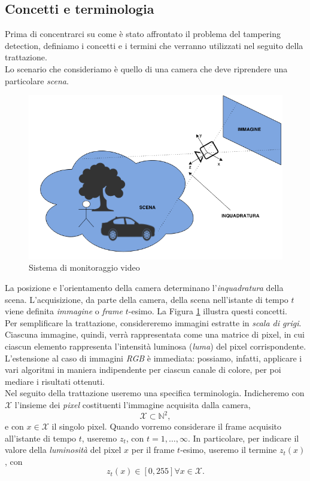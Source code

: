 \subsection{Concetti e terminologia}
\label{concetti}
Prima di concentrarci su come \`e stato affrontato il problema del tampering detection, definiamo i concetti e i termini che verranno utilizzati nel seguito della trattazione.\\
Lo scenario che consideriamo \`e quello di una camera che deve riprendere una particolare \textit{\gls{scena}}.
\begin{figure}[tb]
	\centering
	\includegraphics[width=12cm]{./pictures/videoMonitoring}
	\caption{Sistema di monitoraggio video}
	\label{fig:videoMonitoring}
\end{figure}
\noindent 
La posizione e l'orientamento della camera determinano l'\textit{\gls{inquadratura}} della scena.
L'acquisizione, da parte della camera, della scena nell'istante di tempo $t$ viene definita \textit{immagine} o \textit{frame} $t$-esimo.
La Figura \ref{fig:videoMonitoring} illustra questi concetti.\\
Per semplificare la trattazione, considereremo immagini estratte in \textit{scala di grigi}.
Ciascuna immagine, quindi, verr\`a rappresentata come una matrice di pixel, in cui ciascun elemento rappresenta l'intensit\`a luminosa (\textit{luma}) del pixel corrispondente.
L'estensione al caso di immagini \textit{RGB} \`e immediata: possiamo, infatti, applicare i vari algoritmi in maniera indipendente per ciascun canale di colore, per poi mediare i risultati ottenuti.\\
Nel seguito della trattazione useremo una specifica terminologia.
Indicheremo con $\mathcal{X}$ l'insieme dei \textit{pixel} costituenti l'immagine acquisita dalla camera,
\[ \mathcal{X} \subset \mathbb{N}^2, \]
e con $x \in \mathcal{X}$ il singolo pixel.
Quando vorremo considerare il frame acquisito all'istante di tempo $t$, useremo $z_t$, con $t=1,\dots , \infty$. 
In particolare, per indicare il valore della \textit{luminosit\`a} del pixel $x$ per il frame $t$-esimo, useremo il termine $z_t(x)$, con 
\[ z_t(x) \in [0, 255] \forall x \in \mathcal{X}. \]

